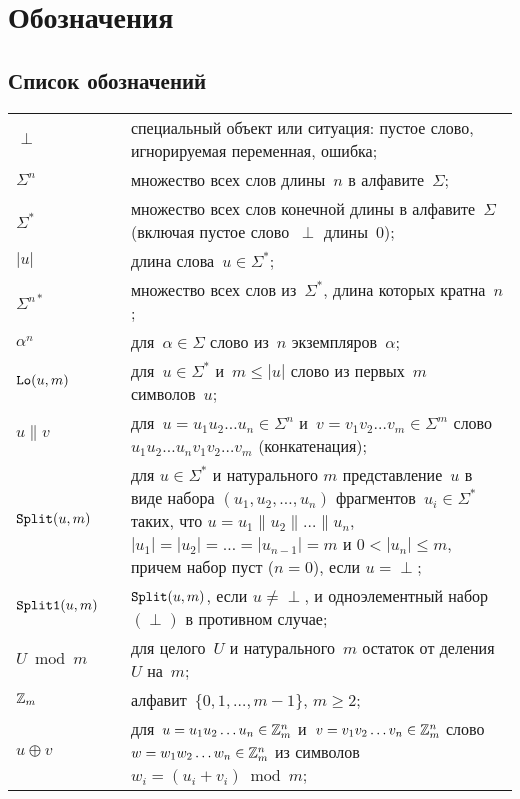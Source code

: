 \chapter{Обозначения}\label{DEFS}

\section{Список обозначений}\label{DEFS.List}

{\tabcolsep 0pt
\begin{longtable}{lrp{13.2cm}}
$\perp$  & \hspace{2mm} &
специальный объект или ситуация: 
пустое слово, игнорируемая переменная, ошибка;
\\[4pt]
%
$\Sigma^n$  &&
множество всех слов длины~$n$ в алфавите~$\Sigma$;
\\[4pt]
%
$\Sigma^*$ &&
множество всех слов конечной длины в алфавите~$\Sigma$
(включая пустое слово~$\perp$ длины~$0$);
\\[4pt]
$|u|$ &&
длина слова~$u\in\Sigma^*$;
\\[4pt]
%
$\Sigma^{n*}$ &&
множество всех слов из~$\Sigma^*$, длина которых кратна~$n$;
\\[4pt]
%
$\alpha^n$ &&
для~$\alpha\in\Sigma$ слово из~$n$ экземпляров~$\alpha$;
\\[4pt]
%
$\mathop{\texttt{Lo}}\nolimits(u,m)$ &&
для~$u\in\Sigma^*$ и~$m\leq|u|$
слово из первых~$m$ символов~$u$;
\\[4pt]
%
$u\parallel v$ &&
для~$u=u_1 u_2\ldots u_n\in\Sigma^n$ 
и~$v=v_1 v_2\ldots v_m\in\Sigma^m$
слово~$u_1 u_2\ldots u_n v_1 v_2\ldots v_m$
(конкатенация);
\\[4pt]
%
$\mathop{\texttt{Split}}\nolimits(u,m)$ &&
для $u\in\Sigma^*$ и натурального $m$ представление~$u$
в виде набора $(u_1,u_2,\ldots,u_n)$ фрагментов~$u_i\in\Sigma^*$ 
таких, что
$u=u_1\parallel u_2\parallel\ldots\parallel u_n$,
$|u_1|=|u_2|=\ldots=|u_{n-1}|=m$ и $0<|u_n|\leq m$, 
причем набор пуст ($n=0$), если $u=\perp$;
\\[4pt]
%
$\mathop{\texttt{Split1}}\nolimits(u,m)$ &&
$\mathop{\texttt{Split}}\nolimits(u,m)$, если $u\neq\perp$, и одноэлементный 
набор $(\perp)$ в противном случае;
\\[4pt]
%
$U\bmod m$ &&
для целого~$U$ и натурального~$m$ остаток от деления~$U$ на~$m$; 
\\[4pt]
%
$\mathbb{Z}_m$ && 
алфавит~$\{0,1,\ldots,m-1\}$, $m\geq 2$;
\\[4pt]
%
$u\oplus v$ &&
для~$u=u_1 u_2\ldots u_n\in\mathbb{Z}_m^n$ 
и~$v=v_1 v_2\ldots v_n\in\mathbb{Z}_m^n$
слово~$w=w_1 w_2\ldots w_n\in\mathbb{Z}_m^n$
из символов~$w_i=(u_i+v_i)\bmod{m}$;

\end{longtable}}
